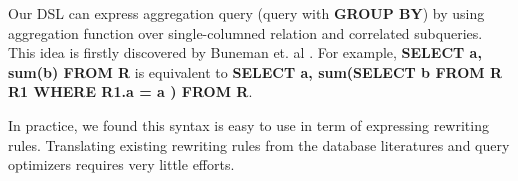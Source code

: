 Our DSL can express aggregation query (query with \textbf{GROUP BY}) by
using aggregation function over single-columned relation and correlated subqueries. This idea is firstly discovered by Buneman et. al \cite{comp_syntax}. For example, \textbf{SELECT a, sum(b) FROM R} 
is equivalent to \textbf{SELECT a, sum(SELECT b FROM R R1 WHERE R1.a = a ) FROM R}.

In practice, we found this syntax is easy to use in term of expressing 
rewriting rules. Translating existing rewriting rules from the database 
literatures and query optimizers requires very little efforts.

